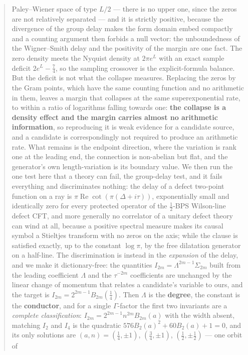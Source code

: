 \documentclass[11pt]{article}
\numberwithin{equation}{section}
\theoremstyle{definition}
\theoremstyle{remark}
\newcommand{\re}{\operatorname{Re}}
\begin{document}
\begin{abstract}
Paley--Wiener space of type $L/2$ --- there is no upper one, since the zeros are
not relatively separated --- and it is strictly positive, because the divergence
of the group delay makes the form domain embed compactly and a counting argument
then forbids a null vector: the unboundedness of the Wigner--Smith delay and the
positivity of the margin are one fact. The zero density meets the Nyquist density
at $2\pi e^L$ with an exact sample deficit $2e^L-\frac74$, so the sampling
crossover is the explicit-formula balance. But the deficit is not what the
collapse measures. Replacing the zeros by the Gram points, which have the same
counting function and no arithmetic in them, leaves a margin that collapses at the
same superexponential rate, to within a ratio of logarithms falling towards one:
\textbf{the collapse is a density effect and the margin carries almost no
arithmetic information}, so reproducing it is weak evidence for a candidate
source, and a candidate is correspondingly not required to produce an arithmetic
rate. What remains is the endpoint direction, where the variation is rank one at
the leading end,
the connection is non-abelian but flat, and the generator's own length-variation
is its boundary value. We then run the one test here that a theory can fail, the group-delay test, and
it fails everything and discriminates nothing: the delay of a defect two-point
function on a ray is $\pi\re\cot(\pi(\Delta+i\tau))$, exponentially small and
identically zero for every protected operator of the $\frac12$-BPS Wilson-line
defect CFT, and more generally no correlator of a unitary defect theory can wind
at all, because a positive spectral measure makes its causal symbol a Stieltjes
transform with no zeros on the axis; while the clause is satisfied exactly, up to
the constant $\log\pi$, by the free dilatation generator on a half-line. The
discrimination is instead in the \emph{expansion} of the delay, and we make it
dictionary-free: the quantities $I_{2m}=\Lambda^{2m-1}\Sigma_{2m}$ built from the
leading coefficient $\Lambda$ and the $\tau^{-2m}$ coefficients are unchanged by
the linear change of momentum that relates a candidate's variable to ours, and
the target is $I_{2m}=2^{2m-1}B_{2m}(\frac14)$. Then $\Lambda$ is the
\textbf{degree}, the constant is the \textbf{conductor}, and for a single
$\Gamma$-factor the first two invariants are a \emph{complete classification}:
$I_{2m}=2^{2m-1}n^{2m}B_{2m}(a)$ with the width absent, matching $I_2$ and $I_4$
is the quadratic $576B_2(a)^2+60B_2(a)+1=0$, and its only solutions are
$(a,n)=(\frac14,\pm1)$, $(\frac34,\pm1)$, $(\frac12,\pm\frac12)$ --- one orbit of

\end{abstract}
\end{document}
